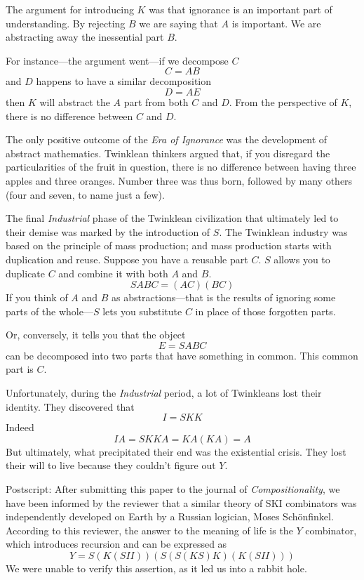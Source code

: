 \documentclass[11pt]{amsart}
\begin{document}
The argument for introducing $K$ was that ignorance is an important part of understanding. By rejecting $B$ we are saying that $A$ is important. We are abstracting away the inessential part $B$. 

For instance---the argument went---if we decompose $C$
 \[ C = A B\]
and $D$ happens to have a similar decomposition
 \[ D = A E\]
then $K$ will abstract the $A$ part from both $C$ and $D$. From the perspective of $K$, there is no difference between $C$ and $D$. 

The only positive outcome of the \emph{Era of Ignorance} was the development of abstract mathematics. Twinklean thinkers argued that, if you disregard the particularities of the fruit in question, there is no difference between having three apples and three oranges. Number three was thus born, followed by many others (four and seven, to name just a few).

The final \emph{Industrial} phase of the Twinklean civilization that ultimately led to their demise was marked by the introduction of $S$. The Twinklean industry was based on the principle of mass production; and mass production starts with duplication and reuse. Suppose you have a reusable part $C$. $S$ allows you to duplicate $C$ and combine it with both $A$ and $B$. 
 \[ S A B C = (A C) (B C)\]
If you think of $A$ and $B$ as abstractions---that is the results of ignoring some parts of the whole---$S$ lets you substitute $C$ in place of those forgotten parts. 

Or, conversely, it tells you that the object
 \[ E = S A B C\]
can be decomposed into two parts that have something in common. This common part is $C$.

Unfortunately, during the \emph{Industrial} period, a lot of Twinkleans lost their identity. They discovered that
 \[ I = S K K\]
Indeed
 \[ I A = S K K A = K A (K A) = A\]
But ultimately, what precipitated their end was the existential crisis. They lost their will to live because they couldn't figure out $Y$.

Postscript: After submitting this paper to the journal of \emph{Compositionality}, we have been informed by the reviewer that a similar theory of SKI combinators was independently developed on Earth by a Russian logician, Moses Schönfinkel. According to this reviewer, the answer to the meaning of life is the $Y$ combinator, which introduces recursion and can be expressed as 
 \[ Y = S(K(SII))(S(S(KS)K)(K(SII)))\]
We were unable to verify this assertion, as it led us into a rabbit hole.
\end{document}
